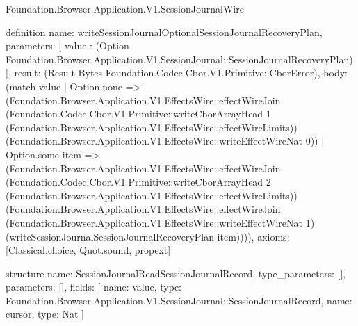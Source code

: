 \begin{lexlean}{Foundation.Browser.Application.V1.SessionJournalWire}
\begin{semanticmodule}
definition{
  name: writeSessionJournalOptionalSessionJournalRecoveryPlan,
  parameters: [
    value : (Option Foundation.Browser.Application.V1.SessionJournal::SessionJournalRecoveryPlan)
  ],
  result: (Result Bytes Foundation.Codec.Cbor.V1.Primitive::CborError),
  body: (match value
    | Option.none => (Foundation.Browser.Application.V1.EffectsWire::effectWireJoin (Foundation.Codec.Cbor.V1.Primitive::writeCborArrayHead 1 (Foundation.Browser.Application.V1.EffectsWire::effectWireLimits)) (Foundation.Browser.Application.V1.EffectsWire::writeEffectWireNat 0))
    | Option.some item => (Foundation.Browser.Application.V1.EffectsWire::effectWireJoin (Foundation.Codec.Cbor.V1.Primitive::writeCborArrayHead 2 (Foundation.Browser.Application.V1.EffectsWire::effectWireLimits)) (Foundation.Browser.Application.V1.EffectsWire::effectWireJoin (Foundation.Browser.Application.V1.EffectsWire::writeEffectWireNat 1) (writeSessionJournalSessionJournalRecoveryPlan item)))),
  axioms: [Classical.choice, Quot.sound, propext]
}

structure{
  name: SessionJournalReadSessionJournalRecord,
  type_parameters: [],
  parameters: [],
  fields: [
    {name: value, type: Foundation.Browser.Application.V1.SessionJournal::SessionJournalRecord},
    {name: cursor, type: Nat}
  ]
}


\end{semanticmodule}
\end{lexlean}
